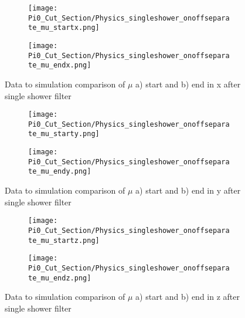 \documentclass{article}
\begin{document}
\begin{figure}[H]
\centering
  \begin{subfigure}[t]{0.3\textwidth}
    \centering
\texttt{[image: Pi0\_Cut\_Section/Physics\_singleshower\_onoffseparate\_mu\_startx.png]}
  \caption{ }
  \end{subfigure} 
  \hspace{30mm}
  \begin{subfigure}[t]{0.3\textwidth}
    \centering
\texttt{[image: Pi0\_Cut\_Section/Physics\_singleshower\_onoffseparate\_mu\_endx.png]}
  \caption{ }
  \end{subfigure} 
\caption{ Data to simulation comparison of $\mu$ a) start and b) end in x after single shower filter }
\label{fig:physics_singleshower_x}
\end{figure}

\begin{figure}[H]
\centering
  \begin{subfigure}[t]{0.3\textwidth}
    \centering
\texttt{[image: Pi0\_Cut\_Section/Physics\_singleshower\_onoffseparate\_mu\_starty.png]}
  \caption{ }
  \end{subfigure} 
  \hspace{30mm}
  \begin{subfigure}[t]{0.3\textwidth}
    \centering
\texttt{[image: Pi0\_Cut\_Section/Physics\_singleshower\_onoffseparate\_mu\_endy.png]}
  \caption{ }
  \end{subfigure} 
\caption{ Data to simulation comparison of $\mu$ a) start and b) end in y after single shower filter }
\label{fig:physics_singleshower_y}
\end{figure}

\begin{figure}[H]
\centering
  \begin{subfigure}[t]{0.3\textwidth}
    \centering
\texttt{[image: Pi0\_Cut\_Section/Physics\_singleshower\_onoffseparate\_mu\_startz.png]}
  \caption{ }
  \end{subfigure} 
  \hspace{30mm}
  \begin{subfigure}[t]{0.3\textwidth}
    \centering
\texttt{[image: Pi0\_Cut\_Section/Physics\_singleshower\_onoffseparate\_mu\_endz.png]}
  \caption{ }
  \end{subfigure} 
\caption{ Data to simulation comparison of $\mu$ a) start and b) end in z after single shower filter }
\label{fig:physics_singleshower_z}
\end{figure}
\end{document}
